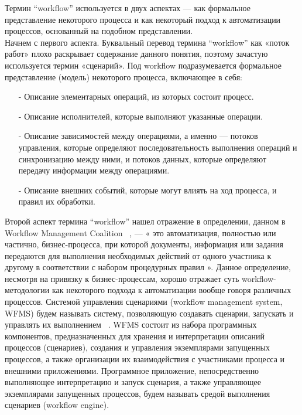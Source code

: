 \documentclass[a4paper,14pt]{article}
\begin{document}
Термин “workflow” используется в двух аспектах — как формальное
представление некоторого процесса и как некоторый подход к автоматизации процессов, основанный на подобном представлении.\\
Начнем с первого аспекта. Буквальный перевод термина “workflow”
как «поток работ» плохо раскрывает содержание данного понятия, поэтому
зачастую используется термин «сценарий». Под workflow подразумевается формальное представление (модель) некоторого процесса,
включающее в себя:
\begin{enumerate}
\item[-] Описание элементарных операций, из которых состоит процесс.
\item[-] Описание исполнителей, которые выполняют указанные операции.
\item[-] Описание зависимостей между операциями, а именно — потоков управления, которые определяют последовательность выполнения
операций и синхронизацию между ними, и потоков данных, которые
определяют передачу информации между операциями.
\item[-] Описание внешних событий, которые могут влиять на ход процесса,
и правил их обработки.
\end{enumerate}
Второй аспект термина “workflow” нашел отражение в определении,
данном в Workflow Management Coalition ~\cite{2}, — « это автоматизация, полностью или частично, бизнес-процесса, при которой документы, информация или задания передаются для выполнения необходимых действий
от одного участника к другому в соответствии с набором процедурных
правил ». Данное определение, несмотря на привязку к бизнес-процессам, хорошо отражает суть workflow-методологии как некоторого подхода
к автоматизации вообще говоря различных процессов.
Системой управления сценариями (workflow management system, WFMS)
будем называть систему, позволяющую создавать сценарии, запускать
и управлять их выполнением ~\cite{2}. WFMS состоит из набора программных
компонентов, предназначенных для хранения и интерпретации описаний
процессов (сценариев), создания и управления экземплярами запущенных процессов, а также организации их взаимодействия с участниками
процесса и внешними приложениями.
Программное приложение, непосредственно выполняющее интерпретацию и запуск сценария, а также управляющее экземплярами запущенных процессов, будем называть средой выполнения сценариев (workflow
engine).
\end{document}
